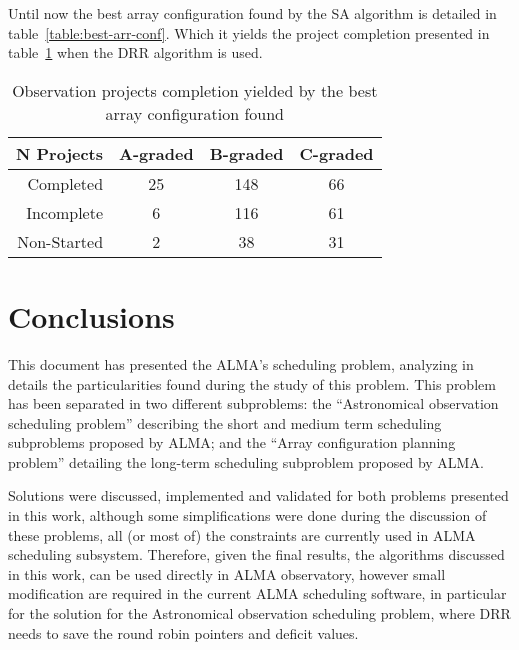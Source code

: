 Until now the best array configuration found by the SA algorithm is detailed in table~\ref{table:best-arr-conf}. Which it yields the project completion presented in table~\ref{table:best-solution-found} when the DRR algorithm is used.

\begin{table}[htbp]
\centering
\begin{tabular}{|r|c|c|c|} \hline
 N Projects & A-graded & B-graded & C-graded \\ \hline
 Completed & 25 & 148 & 66 \\ \hline
 Incomplete & 6 & 116 & 61 \\ \hline
 Non-Started & 2 & 38 & 31 \\ \hline
\end{tabular}
\caption{Observation projects completion yielded by the best array configuration found}
\label{table:best-solution-found}
\end{table}

\chapter{Conclusions}
This document has presented the ALMA's scheduling problem, analyzing in details the particularities found during the study of this problem. This problem has been separated in two different subproblems: the ``Astronomical observation scheduling problem'' describing the short and medium term scheduling subproblems proposed by ALMA; and the ``Array configuration planning problem'' detailing the long-term scheduling subproblem proposed by ALMA.

Solutions were discussed, implemented and validated for both problems presented in this work, although some simplifications were done during the discussion of these problems, all (or most of) the constraints are currently used in ALMA scheduling subsystem. Therefore, given the final results, the algorithms discussed in this work, can be used directly in ALMA observatory, however small modification are required in the current ALMA scheduling software, in particular for the solution for the Astronomical observation scheduling problem, where DRR needs to save the round robin pointers and deficit values.

